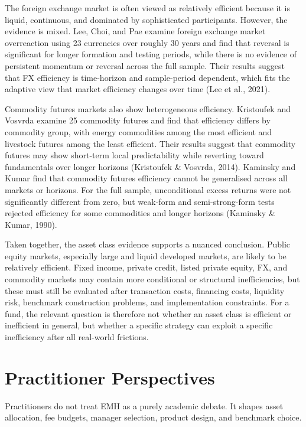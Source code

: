 \documentclass[11pt,a4paper]{article}
\begin{document}
The foreign exchange market is often viewed as relatively efficient because it is liquid, continuous, and dominated by sophisticated participants. However, the evidence is mixed. Lee, Choi, and Pae examine foreign exchange market overreaction using 23 currencies over roughly 30 years and find that reversal is significant for longer formation and testing periods, while there is no evidence of persistent momentum or reversal across the full sample. Their results suggest that FX efficiency is time-horizon and sample-period dependent, which fits the adaptive view that market efficiency changes over time (Lee et al., 2021).

Commodity futures markets also show heterogeneous efficiency. Kristoufek and Vosvrda examine 25 commodity futures and find that efficiency differs by commodity group, with energy commodities among the most efficient and livestock futures among the least efficient. Their results suggest that commodity futures may show short-term local predictability while reverting toward fundamentals over longer horizons (Kristoufek \& Vosvrda, 2014). Kaminsky and Kumar find that commodity futures efficiency cannot be generalised across all markets or horizons. For the full sample, unconditional excess returns were not significantly different from zero, but weak-form and semi-strong-form tests rejected efficiency for some commodities and longer horizons (Kaminsky \& Kumar, 1990).

Taken together, the asset class evidence supports a nuanced conclusion. Public equity markets, especially large and liquid developed markets, are likely to be relatively efficient. Fixed income, private credit, listed private equity, FX, and commodity markets may contain more conditional or structural inefficiencies, but these must still be evaluated after transaction costs, financing costs, liquidity risk, benchmark construction problems, and implementation constraints. For a fund, the relevant question is therefore not whether an asset class is efficient or inefficient in general, but whether a specific strategy can exploit a specific inefficiency after all real-world frictions.

\section{Practitioner Perspectives}

Practitioners do not treat EMH as a purely academic debate. It shapes asset allocation, fee budgets, manager selection, product design, and benchmark choice.
\end{document}
